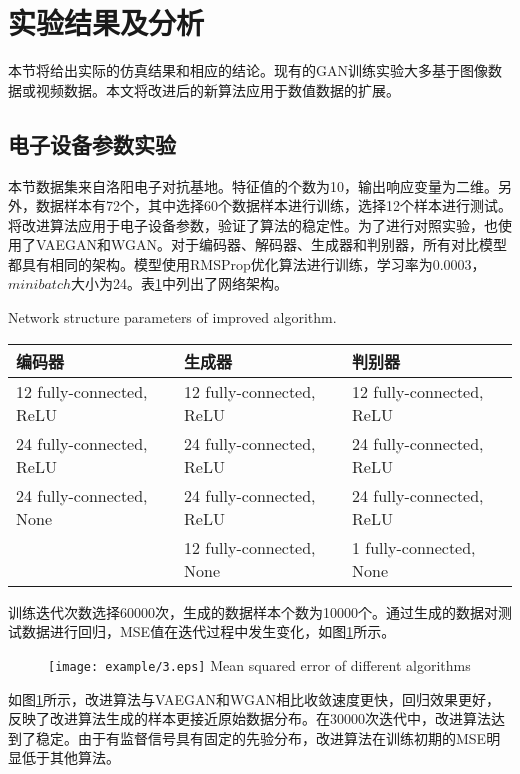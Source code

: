\section{实验结果及分析}
本节将给出实际的仿真结果和相应的结论。现有的GAN训练实验大多基于图像数据或视频数据。本文将改进后的新算法应用于数值数据的扩展。

\subsection{电子设备参数实验}

本节数据集来自洛阳电子对抗基地。特征值的个数为10，输出响应变量为二维。另外，数据样本有72个，其中选择60个数据样本进行训练，选择12个样本进行测试。将改进算法应用于电子设备参数，验证了算法的稳定性。为了进行对照实验，也使用了VAEGAN和WGAN。对于编码器、解码器、生成器和判别器，所有对比模型都具有相同的架构。模型使用RMSProp优化算法进行训练，学习率为0.0003，$minibatch$大小为24。表\ref{tab3}中列出了网络架构。

\begin{table}[htpb]
	\centering
	{Network structure parameters of improved algorithm.}
	\label{tab3}
	\begin{tabular}{lll} \toprule
		编码器   & 生成器 & 判别器  \\  \midrule
		12 fully-connected, ReLU &12 fully-connected, ReLU&12 fully-connected, ReLU\\
		24 fully-connected, ReLU&24 fully-connected, ReLU&24 fully-connected, ReLU\\
		24 fully-connected, None&24 fully-connected, ReLU&24 fully-connected, ReLU\\
		&12 fully-connected, None&1 fully-connected, None\\ \bottomrule
	\end{tabular}
\end{table}

训练迭代次数选择60000次，生成的数据样本个数为10000个。通过生成的数据对测试数据进行回归，MSE值在迭代过程中发生变化，如图\ref{fig3}所示。

\begin{figure}[htpb]
	\centering
	\texttt{[image: example/3.eps]}
	{Mean squared error of different algorithms}
	\label{fig3}
\end{figure}

如图\ref{fig3}所示，改进算法与VAEGAN和WGAN相比收敛速度更快，回归效果更好，反映了改进算法生成的样本更接近原始数据分布。在30000次迭代中，改进算法达到了稳定。由于有监督信号具有固定的先验分布，改进算法在训练初期的MSE明显低于其他算法。


